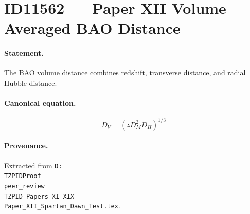 \section*{ID11562 --- Paper XII Volume Averaged BAO Distance}

\paragraph{Statement.}
The BAO volume distance combines redshift, transverse distance, and radial Hubble distance.

\paragraph{Canonical equation.}
\[
D_V=(zD_M^2D_H)^{1/3}
\]

\paragraph{Provenance.}
Extracted from \texttt{D:\\TZPIDProof\\peer\_review\\TZPID\_Papers\_XI\_XIX\\Paper\_XII\_Spartan\_Dawn\_Test.tex}.
